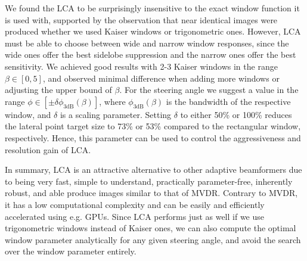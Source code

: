 \documentclass[10pt,journal,draftclsnofoot,onecolumn]{IEEEtran}
\newcommand\1{\vec 1}
\begin{document}
We found the LCA to be surprisingly insensitive to the exact window function it is used with, supported by the observation that near identical images were produced whether we used Kaiser windows or trigonometric ones. However, LCA must be able to choose between wide and narrow window responses, since the wide ones offer the best sidelobe suppression and the narrow ones offer the best sensitivity. We achieved good results with 2-3 Kaiser windows in the range $\beta\in[0,5]$, and observed minimal difference when adding more windows or adjusting the upper bound of $\beta$. For the steering angle we suggest a value in the range $\phi\in[\pm\delta\phi_\text{3dB}(\beta)]$, where $\phi_\text{3dB}(\beta)$ is the bandwidth of the respective window, and $\delta$ is a scaling parameter. Setting $\delta$ to either 50\% or 100\% reduces the lateral point target size to 73\% or 53\% compared to the rectangular window, respectively. Hence, this parameter can be used to control the aggressiveness and resolution gain of LCA.

In summary, LCA is an attractive alternative to other adaptive beamformers due to being very fast, simple to understand, practically parameter-free, inherently robust, and able produce images similar to that of MVDR. Contrary to MVDR, it has a low computational complexity and can be easily and efficiently accelerated using e.g. GPUs. Since LCA performs just as well if we use trigonometric windows instead of Kaiser ones, we can also compute the optimal window parameter analytically for any given steering angle, and avoid the search over the window parameter entirely.




% 

% 
% 
\end{document}
